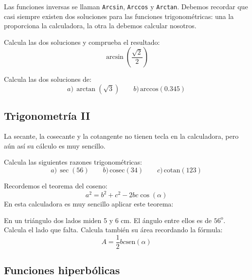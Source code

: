 \documentclass[12pt]{article}
\newenvironment{capitulo}{\begin{tcolorbox}[colback=blue!5!white,colframe=red!75!black]}{\end{tcolorbox}\bigskip}
\newenvironment{ejer}{\begin{tcolorbox}[center title, 
fonttitle=\sffamily\bfseries,colback=blue!5,colframe=orange]}{\end{tcolorbox}}
\begin{document}
Las funciones inversas  se llaman \texttt{Arcsin}, \texttt{Arccos} y \texttt{Arctan}. Debemos recordar que casi siempre existen dos soluciones para las funciones trigonométricas: una la proporciona la calculadora, la otra la debemos calcular nosotros.



\begin{ejer}

Calcula las dos soluciones y comprueba el resultado:
\[
\arcsin\left(\frac{\sqrt{2}}{2}\right)
\]

\end{ejer}

\begin{ejer}

Calcula las dos soluciones de:
\[
a)\, \arctan(\sqrt{3}) \qquad b)\,\mathrm{arccos}(0.345)
\]

\end{ejer}

\newpage

\begin{capitulo}
\section*{Trigonometría II}
\end{capitulo}

La secante, la cosecante y la cotangente no tienen tecla en la calculadora, pero aún así su cálculo es muy sencillo.

\begin{ejer}

Calcula las siguientes razones trigonométricas:
\[
a)\, \sec(56) \qquad b)\, \mathrm{cosec}(34) \qquad  c)\, \mathrm{cotan}(123)
\]

\end{ejer}

Recordemos el teorema del coseno:
\[
a^2 = b^2+c^2-2bc\cos(\alpha)
\]
En esta calculadora es muy sencillo aplicar este teorema:

\begin{ejer}

En un triángulo dos lados miden 5 y 6 cm. El ángulo entre ellos es de $56^\mathrm{o}$. Calcula el lado que falta. Calcula también su área recordando la fórmula:
\[
A = \frac{1}{2} bc\mathrm{sen}(\alpha)
\]

\end{ejer}


\newpage

\begin{capitulo}
\section*{Funciones hiperbólicas}
\end{capitulo}
\end{document}
